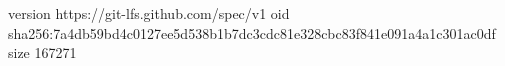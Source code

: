 version https://git-lfs.github.com/spec/v1
oid sha256:7a4db59bd4c0127ee5d538b1b7dc3cdc81e328cbc83f841e091a4a1c301ac0df
size 167271
